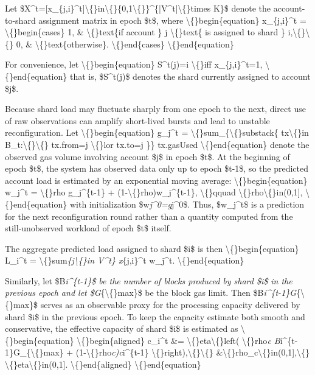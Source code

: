 \documentclass{article}
\begin{document}
Let \$X^t=[x\_\{j,i\}^t]\textbackslash\{\}in\textbackslash\{\}\{0,1\textbackslash\{\}\}^\{|V^t|\textbackslash\{\}times K\}\$ denote the account-to-shard assignment matrix in epoch \$t\$, where
\textbackslash\{\}begin\{equation\}
x\_\{j,i\}^t
=
\textbackslash\{\}begin\{cases\}
1, \& \textbackslash\{\}text\{if account \} j \textbackslash\{\}text\{ is assigned to shard \} i,\textbackslash\{\}\textbackslash\{\}
0, \& \textbackslash\{\}text\{otherwise\}.
\textbackslash\{\}end\{cases\}
\textbackslash\{\}end\{equation\}

For convenience, let
\textbackslash\{\}begin\{equation\}
S^t(j)=i
\textbackslash\{\}iff
x\_\{j,i\}^t=1,
\textbackslash\{\}end\{equation\}
that is, \$S^t(j)\$ denotes the shard currently assigned to account \$j\$.

Because shard load may fluctuate sharply from one epoch to the next, direct use of raw observations can amplify short-lived bursts and lead to unstable reconfiguration. Let
\textbackslash\{\}begin\{equation\}
g\_j^t
=
\textbackslash\{\}sum\_\{\textbackslash\{\}substack\{
tx\textbackslash\{\}in B\_t:\textbackslash\{\}\textbackslash\{\}
tx.from=j \textbackslash\{\}lor tx.to=j
\}\}
tx.gasUsed
\textbackslash\{\}end\{equation\}
denote the observed gas volume involving account \$j\$ in epoch \$t\$. At the beginning of epoch \$t\$, the system has observed data only up to epoch \$t-1\$, so the predicted account load is estimated by an exponential moving average:
\textbackslash\{\}begin\{equation\}
w\_j^t
=
\textbackslash\{\}rho g\_j^\{t-1\}
+
(1-\textbackslash\{\}rho)w\_j^\{t-1\},
\textbackslash\{\}qquad
\textbackslash\{\}rho\textbackslash\{\}in(0,1],
\textbackslash\{\}end\{equation\}
with initialization \$w\emph{j^0=g}j^0\$. Thus, \$w\_j^t\$ is a prediction for the next reconfiguration round rather than a quantity computed from the still-unobserved workload of epoch \$t\$ itself.

The aggregate predicted load assigned to shard \$i\$ is then
\textbackslash\{\}begin\{equation\}
L\_i^t
=
\textbackslash\{\}sum\emph{\{j\textbackslash\{\}in V^t\} x}\{j,i\}^t w\_j^t.
\textbackslash\{\}end\{equation\}

Similarly, let \$B\emph{i^\{t-1\}\$ be the number of blocks produced by shard \$i\$ in the previous epoch and let \$G}\{\textbackslash\{\}max\}\$ be the block gas limit. Then \$B\emph{i^\{t-1\}G}\{\textbackslash\{\}max\}\$ serves as an observable proxy for the processing capacity delivered by shard \$i\$ in the previous epoch. To keep the capacity estimate both smooth and conservative, the effective capacity of shard \$i\$ is estimated as
\textbackslash\{\}begin\{equation\}
\textbackslash\{\}begin\{aligned\}
c\_i^t
\&=
\textbackslash\{\}eta\textbackslash\{\}left(
\textbackslash\{\}rho\emph{c B}i^\{t-1\}G\_\{\textbackslash\{\}max\}
+
(1-\textbackslash\{\}rho\emph{c)c}i^\{t-1\}
\textbackslash\{\}right),\textbackslash\{\}\textbackslash\{\}
\&\textbackslash\{\}rho\_c\textbackslash\{\}in(0,1],\textbackslash\{\} \textbackslash\{\}eta\textbackslash\{\}in(0,1].
\textbackslash\{\}end\{aligned\}
\textbackslash\{\}end\{equation\}
\end{document}

